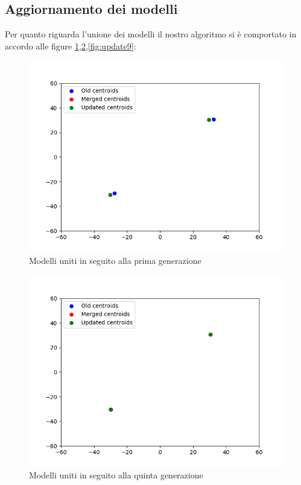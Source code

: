 \subsection{Aggiornamento dei modelli}
Per quanto riguarda l'unione dei modelli il nostro algoritmo si è comportato in accordo alle  figure \ref{fig:update1},\ref{fig:update5},\ref{fig:update9}:
\begin{figure}[!htb]
  \centering
  \includegraphics[scale=0.7]{../Immagini/update1.png}
  \caption{Modelli uniti in seguito alla prima generazione}
  \label{fig:update1}
\end{figure}
\begin{figure}[!htb]
  \centering
  \includegraphics[scale=0.7]{../Immagini/update5.png}
  \caption{Modelli uniti in seguito alla quinta generazione}
  \label{fig:update5}
\end{figure}
